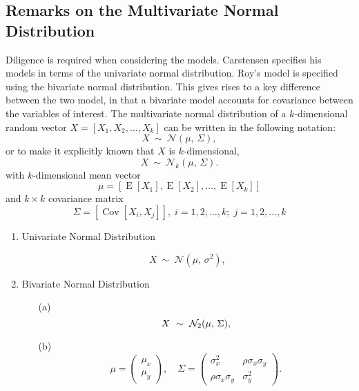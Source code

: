 


\newpage
\subsection{Remarks on the Multivariate Normal Distribution}

Diligence is required when considering the models. Carstensen specifies his models in terms of the univariate normal distribution. Roy's model is specified using the bivariate normal distribution.
This gives rises to a key difference between the two model, in that a bivariate model accounts for covariance between the variables of interest.
The multivariate normal distribution of a $k$-dimensional random vector $X = [X_1, X_2, \ldots, X_k]$
can be written in the following notation:
\[
    X\ \sim\ \mathcal{N}(\mu,\, \Sigma),
\]
or to make it explicitly known that $X$ is $k$-dimensional,
\[
    X\ \sim\ \mathcal{N}_k(\mu,\, \Sigma).
\]
with $k$-dimensional mean vector
\[ \mu = [ \operatorname{E}[X_1], \operatorname{E}[X_2], \ldots, \operatorname{E}[X_k]] \]
and $k \times k$ covariance matrix
\[ \Sigma = [\operatorname{Cov}[X_i, X_j]], \; i=1,2,\ldots,k; \; j=1,2,\ldots,k \]

\bigskip

\begin{enumerate}
\item Univariate Normal Distribution

\[
    X\ \sim\ \mathcal{N}(\mu,\, \sigma^2),
\]

\item Bivariate Normal Distribution

\begin{itemize}
\item[(a)] \[  X\ \sim\ \mathcal{N}_2(\mu,\, \Sigma), \vspace{1cm}\]
\item[(b)] \[    \mu = \begin{pmatrix} \mu_x \\ \mu_y \end{pmatrix}, \quad
    \Sigma = \begin{pmatrix} \sigma_x^2 & \rho \sigma_x \sigma_y \\
                             \rho \sigma_x \sigma_y  & \sigma_y^2 \end{pmatrix}.\]
\end{itemize}
\end{enumerate}
\newpage
